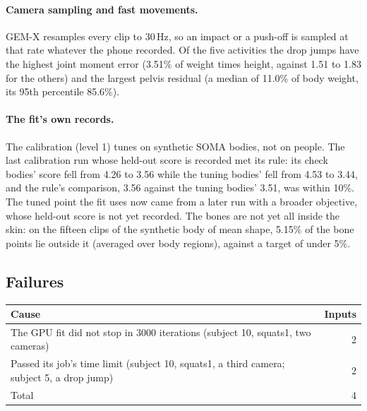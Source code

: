 \documentclass[11pt]{article}
\begin{document}
\paragraph{Camera sampling and fast movements.} GEM-X resamples every clip to 30\,Hz, so an impact or a push-off is
sampled at that rate whatever the phone recorded. Of the five activities the drop jumps have the highest joint moment
error (3.51\% of weight times height, against 1.51 to 1.83 for the others) and the largest pelvis residual (a median of
11.0\% of body weight, its 95th percentile 85.6\%).

\paragraph{The fit's own records.} The calibration (level 1) tunes on synthetic SOMA bodies, not on people. The last
calibration run whose held-out score is recorded met its rule: its check bodies' score fell from 4.26 to 3.56 while the tuning bodies' fell
from 4.53 to 3.44, and the rule's comparison, 3.56 against the tuning bodies' 3.51, was within 10\%. The tuned point
the fit uses now came from a later run with a broader objective, whose held-out score is not yet recorded. The bones
are not yet all inside the skin: on the fifteen clips of the synthetic body of mean shape, 5.15\% of the bone points
lie outside it (averaged over body regions), against a target of under 5\%.

\FloatBarrier
\subsection{Failures}
\label{app:failures}

\begin{center}\small
{}
\begin{tabular}{@{}lr@{}}
\toprule
Cause & Inputs \\
\midrule
The GPU fit did not stop in 3000 iterations (subject 10, squats1, two cameras) & 2 \\
Passed its job's time limit (subject 10, squats1, a third camera; subject 5, a drop jump) & 2 \\
\midrule
Total & 4 \\
\bottomrule
\end{tabular}
\end{center}
\clearpage
\end{document}
